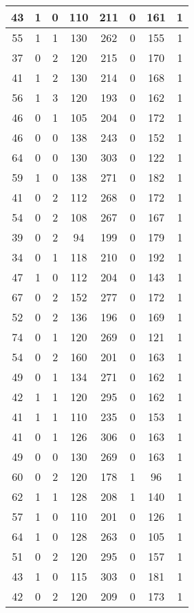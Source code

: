 \documentclass{article}
\begin{document}
\begin{longtable}{|c|c|c|c|c|c|c|c|}
43 & 1 & 0 & 110 & 211 & 0 & 161 & 1 \\ \hline
55 & 1 & 1 & 130 & 262 & 0 & 155 & 1 \\ \hline
37 & 0 & 2 & 120 & 215 & 0 & 170 & 1 \\ \hline
41 & 1 & 2 & 130 & 214 & 0 & 168 & 1 \\ \hline
56 & 1 & 3 & 120 & 193 & 0 & 162 & 1 \\ \hline
46 & 0 & 1 & 105 & 204 & 0 & 172 & 1 \\ \hline
46 & 0 & 0 & 138 & 243 & 0 & 152 & 1 \\ \hline
64 & 0 & 0 & 130 & 303 & 0 & 122 & 1 \\ \hline
59 & 1 & 0 & 138 & 271 & 0 & 182 & 1 \\ \hline
41 & 0 & 2 & 112 & 268 & 0 & 172 & 1 \\ \hline
54 & 0 & 2 & 108 & 267 & 0 & 167 & 1 \\ \hline
39 & 0 & 2 & 94 & 199 & 0 & 179 & 1 \\ \hline
34 & 0 & 1 & 118 & 210 & 0 & 192 & 1 \\ \hline
47 & 1 & 0 & 112 & 204 & 0 & 143 & 1 \\ \hline
67 & 0 & 2 & 152 & 277 & 0 & 172 & 1 \\ \hline
52 & 0 & 2 & 136 & 196 & 0 & 169 & 1 \\ \hline
74 & 0 & 1 & 120 & 269 & 0 & 121 & 1 \\ \hline
54 & 0 & 2 & 160 & 201 & 0 & 163 & 1 \\ \hline
49 & 0 & 1 & 134 & 271 & 0 & 162 & 1 \\ \hline
42 & 1 & 1 & 120 & 295 & 0 & 162 & 1 \\ \hline
41 & 1 & 1 & 110 & 235 & 0 & 153 & 1 \\ \hline
41 & 0 & 1 & 126 & 306 & 0 & 163 & 1 \\ \hline
49 & 0 & 0 & 130 & 269 & 0 & 163 & 1 \\ \hline
60 & 0 & 2 & 120 & 178 & 1 & 96 & 1 \\ \hline
62 & 1 & 1 & 128 & 208 & 1 & 140 & 1 \\ \hline
57 & 1 & 0 & 110 & 201 & 0 & 126 & 1 \\ \hline
64 & 1 & 0 & 128 & 263 & 0 & 105 & 1 \\ \hline
51 & 0 & 2 & 120 & 295 & 0 & 157 & 1 \\ \hline
43 & 1 & 0 & 115 & 303 & 0 & 181 & 1 \\ \hline
42 & 0 & 2 & 120 & 209 & 0 & 173 & 1 \\ \hline

\end{longtable}
\end{document}
